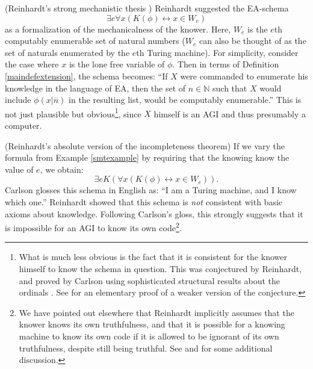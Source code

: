 \documentclass[runningheads]{llncs}
\begin{document}
\begin{example}
\label{smtexample}
    (Reinhardt's strong mechanistic thesis
    \cite{reinhardt1985absolute} \cite{reinhardt1986epistemic}
    \cite{carlson}) Reinhardt suggested the
    EA-schema
    \[\exists e \forall x ( K(\phi) \leftrightarrow x\in W_e)\]
    as a formalization of the mechanicalness of the knower. Here, $W_e$
    is the $e$th computably enumerable set of natural numbers ($W_e$ can also
    be thought of as the set of naturals enumerated by the $e$th Turing machine).
    For simplicity, consider the case where $x$ is the lone free variable
    of $\phi$. Then in terms of Definition \ref{maindefextension}, the schema
    becomes:
    ``If $X$ were commanded to enumerate his knowledge in the language of EA,
    then the set of $n\in\mathbb N$ such that $X$ would include $\phi(x|\overline n)$
    in the resulting list, would be computably enumerable.''
    This is not just plausible but obvious\footnote{What is much less obvious
    is the fact that it is consistent for the knower himself to
    know the schema in question. This was conjectured by Reinhardt, and
    proved by Carlson \cite{carlson} using sophisticated structural
    results about the ordinals \cite{carlson1999}. See
    \cite{alexander2015fast} for an elementary
    proof of a weaker version of the conjecture.}, since $X$ himself
    is an AGI and thus presumably a computer.
\end{example}

\begin{example}
\label{reinhardtnegativeexample}
  (Reinhardt's absolute version of the incompleteness theorem)
  If we vary the formula from Example \ref{smtexample} by requiring that the
  knowing know the value of $e$, we obtain:
  \[
    \exists e K(\forall x ( K(\phi) \leftrightarrow x\in W_e)).
  \]
  Carlson \cite{carlson} glosses this schema in English as:
  ``I am a Turing machine, and I know which one.''
  Reinhardt showed that this schema is \emph{not} consistent with basic
  axioms about knowledge. Following Carlson's gloss, this strongly
  suggests that it is impossible for an AGI to know its own code\footnote{We have
  pointed out elsewhere \cite{alexander2014machine} that Reinhardt
  implicitly assumes that the knower knows its own truthfulness, and that
  it is possible for a knowing machine to know its own code if it is allowed to
  be ignorant of its own truthfulness, despite still being truthful.
  See \cite{aldini2015theory} and \cite{aldini2015self} for some additional discussion.}.
\end{example}
\end{document}
